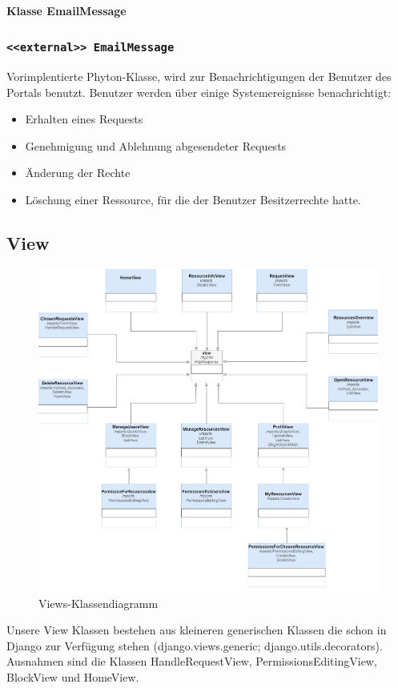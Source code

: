\documentclass[parskip=full,11pt]{scrartcl}
\newcommand{\class}[1]{\subsubsection*{\lstinline[basicstyle=\ttfamily\large]{#1}}}
\begin{document}
 
 
  \paragraph*{Klasse EmailMessage}
 \class{<<external>> EmailMessage}
Vorimplentierte Phyton-Klasse, wird zur Benachrichtigungen der Benutzer des Portals benutzt. Benutzer werden über einige Systemereignisse benachrichtigt:
 \begin{itemize}
	\item Erhalten eines Requests
	\item Genehmigung und Ablehnung abgesendeter Requests
	\item Änderung der Rechte
	\item Löschung einer Ressource, für die der Benutzer Besitzerrechte hatte.
\end{itemize}
\newpage 
\subsection{View}
\begin{figure}[ht!]
	\centering
	\includegraphics[width=\textwidth]{res/views}
	\caption{Views-Klassendiagramm}
\end{figure}

Unsere View Klassen bestehen aus kleineren generischen Klassen die schon in Django zur Verfügung stehen (django.views.generic; django.utils.decorators). Ausnahmen sind die Klassen HandleRequestView, PermissionsEditingView, BlockView und HomeView.
\end{document}
